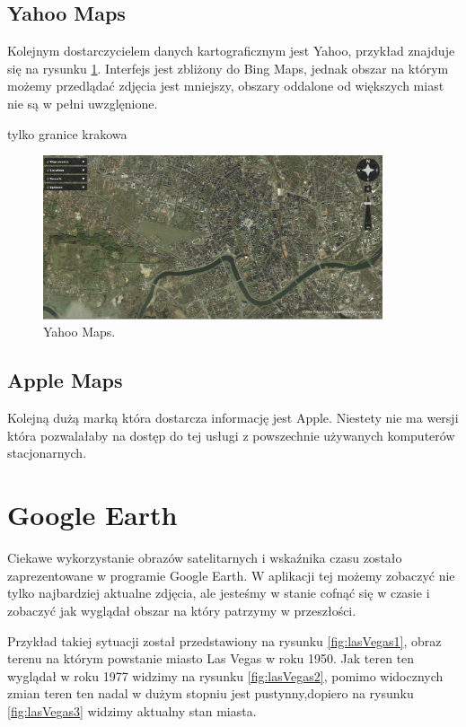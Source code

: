 \subsection{Yahoo Maps}
\label{subsec:Yahoo Maps}

Kolejnym dostarczycielem danych kartograficznym jest Yahoo, przykład znajduje się na rysunku \ref{fig:yahooMaps_1}. Interfejs jest zbliżony do Bing Maps, jednak obszar na którym możemy przedlądać zdjęcia jest mniejszy, obszary oddalone od większych miast nie są w pełni uwzglęnione.

tylko granice krakowa

\begin{figure}[H]
  \centering
    \includegraphics[width=100mm]{ge/yahoo_1.jpg}
  \caption{Yahoo Maps.}
  \label{fig:yahooMaps_1}
\end{figure}

\subsection{Apple Maps}
\label{subsec:Apple Maps}

Kolejną dużą marką która dostarcza informację jest Apple. Niestety nie ma wersji która pozwalałaby na dostęp do tej usługi z powszechnie używanych komputerów stacjonarnych.

\section{Google Earth}
\label{sec:Google Earth}

Ciekawe wykorzystanie obrazów satelitarnych i wskaźnika czasu zostało zaprezentowane w programie Google Earth. W aplikacji tej możemy zobaczyć nie tylko najbardziej aktualne zdjęcia, ale jesteśmy w stanie cofnąć się w czasie i zobaczyć jak wyglądał obszar na który patrzymy w przeszłości.

Przykład takiej sytuacji został przedstawiony na rysunku \ref{fig:lasVegas1}, obraz terenu na którym powstanie miasto Las Vegas w roku 1950. Jak teren ten wyglądał w roku 1977 widzimy na rysunku \ref{fig:lasVegas2}, pomimo widocznych zmian teren ten nadal w dużym stopniu jest pustynny,dopiero na rysunku \ref{fig:lasVegas3} widzimy aktualny stan miasta.

